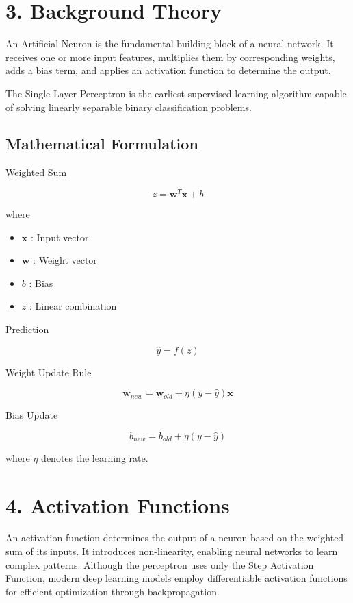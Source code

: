 \documentclass[11pt]{article}
\begin{document}

\section*{3. Background Theory}

An Artificial Neuron is the fundamental building block of a neural network. It receives one or more input features, multiplies them by corresponding weights, adds a bias term, and applies an activation function to determine the output.

The Single Layer Perceptron is the earliest supervised learning algorithm capable of solving linearly separable binary classification problems.

\subsection*{Mathematical Formulation}

Weighted Sum

\[
z=\mathbf{w}^{T}\mathbf{x}+b
\]

where

\begin{itemize}
\item $\mathbf{x}$ : Input vector
\item $\mathbf{w}$ : Weight vector
\item $b$ : Bias
\item $z$ : Linear combination
\end{itemize}

Prediction

\[
\hat y=f(z)
\]

Weight Update Rule

\[
\mathbf{w}_{new}
=
\mathbf{w}_{old}
+
\eta
(y-\hat y)
\mathbf{x}
\]

Bias Update

\[
b_{new}
=
b_{old}
+
\eta
(y-\hat y)
\]

where $\eta$ denotes the learning rate.


\section*{4. Activation Functions}

An activation function determines the output of a neuron based on the weighted sum of its inputs. It introduces non-linearity, enabling neural networks to learn complex patterns. Although the perceptron uses only the Step Activation Function, modern deep learning models employ differentiable activation functions for efficient optimization through backpropagation.
\end{document}
